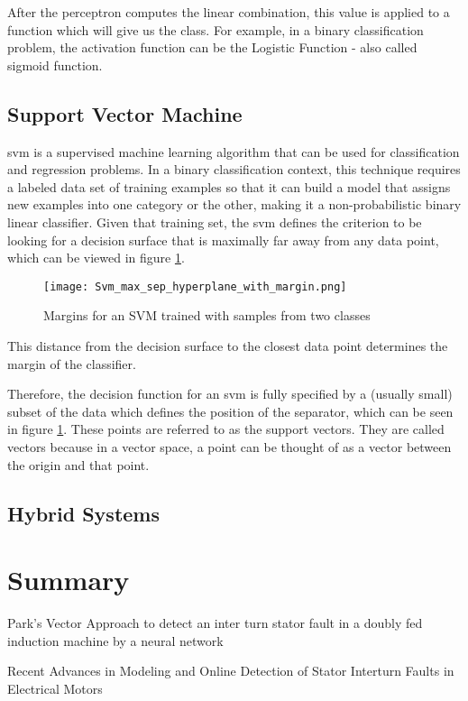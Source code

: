 After the perceptron computes the linear combination, this value is applied to a function which will give us the class. For example, in a binary classification problem, the activation function can be the Logistic Function - also called sigmoid function.

\subsection{Support Vector Machine} %
\label{sec:svm}

\Acrfull{svm} is a supervised machine learning algorithm that can be used for classification and regression problems. In a binary classification context, this technique requires a labeled data set of training examples so that it can build a model that assigns new examples into one category or the other, making it a non-probabilistic binary linear classifier.
Given that training set, the \Acrshort{svm} defines the criterion to be looking for a decision surface that is maximally far away from any data point, which can be viewed in figure \ref{fig:svm_margin}. 

\begin{figure}[htpb]
\centering
\texttt{[image: Svm\_max\_sep\_hyperplane\_with\_margin.png]}
\caption{Margins for an SVM trained with samples from two classes}
\label{fig:svm_margin}
\end{figure}

This distance from the decision surface to the closest data point determines the margin of the classifier.

Therefore, the decision function for an \Acrshort{svm} is fully specified by a (usually small) subset of the data which defines the position of the separator, which can be seen in figure \ref{fig:svm_margin}. These points are referred to as the support vectors. They are called vectors because in a vector space, a point can be thought of as a vector between the origin and that point.

\subsection{Hybrid Systems} %
\label{sec:other_approaches}






\section{Summary} %
\label{sec:related_work_summary}


Park’s Vector Approach to detect an inter turn stator fault in a doubly fed induction machine by a neural network 

Recent Advances in Modeling and Online Detection of Stator Interturn Faults in Electrical Motors
